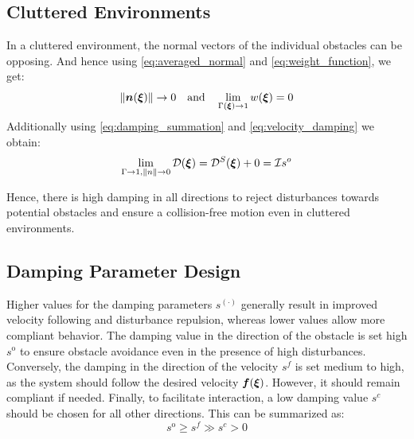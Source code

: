 \subsection{Cluttered Environments}
In a cluttered environment, the normal vectors of the individual obstacles can be opposing. And hence using \eqref{eq:averaged_normal} and \eqref{eq:weight_function}, we get: 
\begin{equation}
    \| \boldsymbol{n}(\boldsymbol{\xi}) \| \rightarrow 0
    \quad \text{and} \quad
    \lim_{\Gamma (\boldsymbol{\xi}) \rightarrow 1} w (\boldsymbol{\xi}) = 0
\end{equation}
Additionally using \eqref{eq:damping_summation} and \eqref{eq:velocity_damping} we obtain:
\begin{equation}
    \lim_{\Gamma \rightarrow 1, \| n \| \rightarrow 0} \mathcal{D}(\boldsymbol{\xi}) 
    = \mathcal{D}^S(\boldsymbol{\xi}) + 0 
    =  \mathcal{I} s^o
\end{equation}

Hence, there is high damping in all directions to reject disturbances towards potential obstacles and ensure a collision-free motion even in cluttered environments.

\iflong
\subsection{Damping Parameter Design}
Higher values for the damping parameters $s^{(\cdot)}$ generally result in improved velocity following and disturbance repulsion, whereas lower values allow more compliant behavior.
The damping value in the direction of the obstacle is set high $s^{\mathrm{o}}$ to ensure obstacle avoidance even in the presence of high disturbances. 
Conversely, the damping in the direction of the velocity $s^{f}$ is set medium to high, as the system should follow the desired velocity $\boldsymbol{f}(\boldsymbol{\xi})$. However, it should remain compliant if needed.
Finally, to facilitate interaction, a low damping value $s^{c}$ should be chosen for all other directions.
This can be summarized as:
\begin{equation}
s^{\mathrm{o}} \geq s^{f} \gg s^{c} > 0
\end{equation}
\fi
